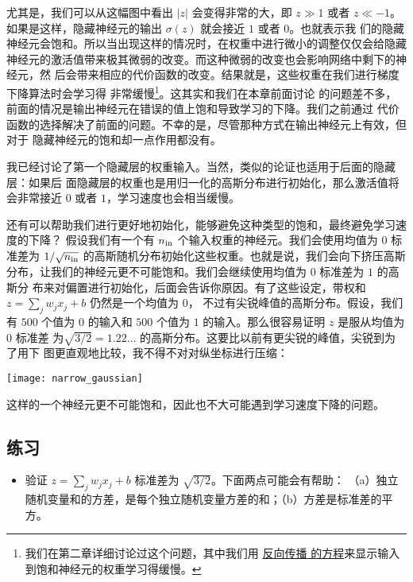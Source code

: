 尤其是，我们可以从这幅图中看出 $|z|$ 会变得非常的大，即 $z \gg 1$ 或者 $z \ll
-1$。如果是这样，隐藏神经元的输出 $\sigma(z)$ 就会接近 $1$ 或者 $0$。也就表示我
们的隐藏神经元会饱和。所以当出现这样的情况时，在权重中进行微小的调整仅仅会给隐藏
神经元的激活值带来极其微弱的改变。而这种微弱的改变也会影响网络中剩下的神经元，然
后会带来相应的代价函数的改变。结果就是，这些权重在我们进行梯度下降算法时会学习得
非常缓慢\footnote{我们在第二章详细讨论过这个问题，其中我们用%
  \hyperref[sec:the_four_fundamental_equations_behind_backpropagation]{反向传播
    的方程}来显示输入到饱和神经元的权重学习得缓慢。}。这其实和我们在本章前面讨论
的问题差不多，前面的情况是输出神经元在错误的值上饱和导致学习的下降。我们之前通过
代价函数的选择解决了前面的问题。不幸的是，尽管那种方式在输出神经元上有效，但对于
隐藏神经元的饱和却一点作用都没有。

我已经讨论了第一个隐藏层的权重输入。当然，类似的论证也适用于后面的隐藏层：如果后
面隐藏层的权重也是用归一化的高斯分布进行初始化，那么激活值将会非常接近 $0$ 或者
$1$，学习速度也会相当缓慢。

还有可以帮助我们进行更好地初始化，能够避免这种类型的饱和，最终避免学习速度的下降？
假设我们有一个有 $n_{\rm in}$ 个输入权重的神经元。我们会使用均值为 $0$ 标准差为
$1/\sqrt{n_{\rm in}}$ 的高斯随机分布初始化这些权重。也就是说，我们会向下挤压高斯
分布，让我们的神经元更不可能饱和。我们会继续使用均值为 $0$ 标准差为 $1$ 的高斯分
布来对偏置进行初始化，后面会告诉你原因。有了这些设定，带权和 $z = \sum_j w_j x_j
+ b$ 仍然是一个均值为 $0$， 不过有尖锐峰值的高斯分布。假设，我们有 $500$ 个值为
$0$ 的输入和 $500$ 个值为 $1$ 的输入。那么很容易证明 $z$ 是服从均值为 $0$ 标准差
为$\sqrt{3/2} = 1.22\ldots$ 的高斯分布。这要比以前有更尖锐的峰值，尖锐到为了用下
图更直观地比较，我不得不对对纵坐标进行压缩：
\begin{center}
  \texttt{[image: narrow\_gaussian]}
\end{center}

这样的一个神经元更不可能饱和，因此也不大可能遇到学习速度下降的问题。

\subsection*{练习}

\begin{itemize}
\item 验证 $z = \sum_j w_j x_j + b$ 标准差为 $\sqrt{3/2}$。下面两点可能会有帮助：
  （a）独立随机变量和的方差，是每个独立随机变量方差的和；（b）方差是标准差的平方。
\end{itemize}

